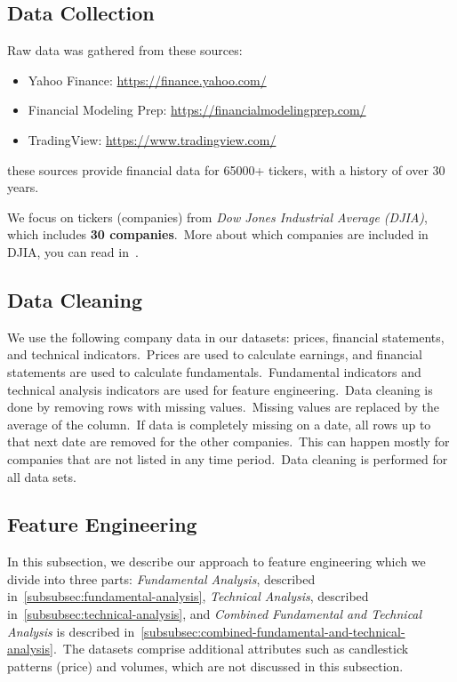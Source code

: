 \documentclass[../xlapes02]{subfiles}
\begin{document}
    \subsection{Data Collection}\label{subsec:data-collection}
    Raw data was gathered from these sources:
    \begin{itemize}
        \label{item:data-sources}
        \item Yahoo Finance: \url{https://finance.yahoo.com/}
        \item Financial Modeling Prep: \url{https://financialmodelingprep.com/}
        \item TradingView: \url{https://www.tradingview.com/}
    \end{itemize}
    these sources provide financial data for 65000+ tickers, with a history of over 30 years.

    We focus on tickers (companies) from \emph{Dow Jones Industrial Average (DJIA)}, which includes \textbf{30 companies}.\ More about which companies are included in DJIA, you can read in~\cite{enwiki:1141766585}.

    \subsection{Data Cleaning}\label{subsec:data-cleaning}
    We use the following company data in our datasets: prices, financial statements, and technical indicators.\ Prices are used to calculate earnings, and financial statements are used to calculate fundamentals.\ Fundamental indicators and technical analysis indicators are used for feature engineering.\ Data cleaning is done by removing rows with missing values.\ Missing values are replaced by the average of the column.\ If data is completely missing on a date, all rows up to that next date are removed for the other companies.\ This can happen mostly for companies that are not listed in any time period.\ Data cleaning is performed for all data sets.

    \subsection{Feature Engineering}\label{subsec:feature-engineering}
    In this subsection, we describe our approach to feature engineering which we divide into three parts: \emph{Fundamental Analysis}, described in~\cref{subsubsec:fundamental-analysis}, \emph{Technical Analysis}, described in~\cref{subsubsec:technical-analysis}, and \emph{Combined Fundamental and Technical Analysis} is described in~\cref{subsubsec:combined-fundamental-and-technical-analysis}.\ The datasets comprise additional attributes such as candlestick patterns (price) and volumes, which are not discussed in this subsection.
\end{document}
